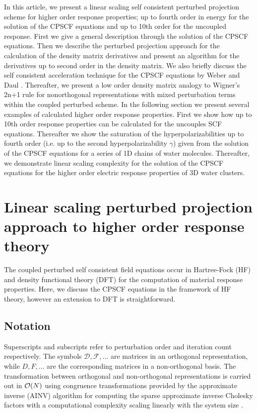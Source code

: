 \documentclass[prl,aps,twocolumn,showpacs,twocolumngrid,superbib]{revtex4}
\begin{document}
 In this article, we present a linear scaling self consistent perturbed projection scheme
 for higher order response properties; up to fourth order in energy for
 the solution of the CPSCF equations and up to 10th order for the uncoupled response.
 First we give a general description through the solution of the CPSCF equations.
 Then we describe the perturbed projection approach for the calculation
 of the density matrix derivatives and present
 an algorithm for the derivatives up to second order in the density matrix.
 We also briefly discuss the self consistent acceleration technique for the 
 CPSCF equations by Weber and Daul \cite{Weber_2003}.
 Thereafter, we present a low order density matrix analogy to Wigner's 2n+1 rule 
 for nonorthogonal representations with mixed perturbation terms within the
 coupled perturbed scheme.  In the following section we present several examples
 of calculated higher order response properties. First we show how up to 10th
 order response properties can be calculated for the uncouples SCF equations.
 Thereafter we show the saturation of the hyperpolarizabilities up to 
 fourth order (i.e. up to the second hyperpolarizability $\gamma$) given from
 the solution of the CPSCF equations for a series of 1D chains of water molecules. 
 Thereafter, we demonstrate linear scaling complexity for the solution of the CPSCF
 equations for the higher order electric response properties of 3D water clusters.

\section{Linear scaling perturbed projection approach to higher order response theory}


The coupled perturbed self consistent field equations occur in Hartree-Fock (HF)
and density functional theory (DFT) for the computation of material response
properties. Here, we discuss the CPSCF equations in the framework of
HF theory, however an extension to DFT is straightforward.

\subsection{Notation}

Superscripts and subscripts refer to perturbation order and 
iteration count respectively. The symbols $\mathcal{D},\mathcal{F},\dots$
are matrices in an orthogonal representation, while
$D,F,\dots$ are the corresponding matrices in a non-orthogonal basis.
The transformation between orthogonal and non-orthogonal 
representations is carried out in ${\cal O}(N)$ using
congruence transformations \cite{JWilkinson65,GStewart73} provided 
by the approximate inverse (AINV) algorithm for computing the sparse 
approximate inverse Cholesky factors with a computational complexity
scaling linearly with the system size \cite{MBenzi95,MBenzi96,MBenzi01}.
\end{document}
